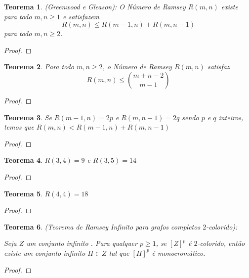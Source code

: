 \documentclass{article}
\newtheorem{teor}{Teorema}[section]
\begin{document}
\begin{teor}
    (Greenwood e Gleason):
    O Número de Ramsey  $R(m, n)$ existe para todo $m,n \geq 1$ e satisfazem
    \[R(m, n) \leq R(m-1, n) + R(m, n-1)\]
    para todo $m,n \geq 2$.
\end{teor}

\begin{proof}

\end{proof}


\begin{teor}
    Para todo $m,n \geq 2$, o Número de Ramsey  $R(m, n)$ satisfaz
    \[R(m, n) \leq \binom{m+n-2}{m-1}\]
\end{teor}

\begin{proof}

\end{proof}


\begin{teor}
    Se $R(m-1, n) = 2p$ e $R(m, n-1) = 2q$ sendo $p$ e $q$ inteiros, temos que $R(m, n) < R(m-1, n) + R(m, n-1)$
\end{teor}

\begin{proof}

\end{proof}


\begin{teor}
    $R(3, 4) = 9$ e $R(3, 5) = 14$
\end{teor}

\begin{proof}

\end{proof}


\begin{teor}
    $R(4, 4) = 18$
\end{teor}

\begin{proof}

\end{proof}


\begin{teor}
    (\emph{Teorema de Ramsey} Infinito para grafos completos $2$\emph{-colorido}):

    Seja $Z$ um conjunto infinito . Para qualquer $p \ge 1$, se $[Z]^p$ é $2$\emph{-colorido}, então existe um conjunto infinito $H \in Z$ tal que $[H]^p$ é monocromático.
\end{teor}

\begin{proof}

\end{proof}
\end{document}
